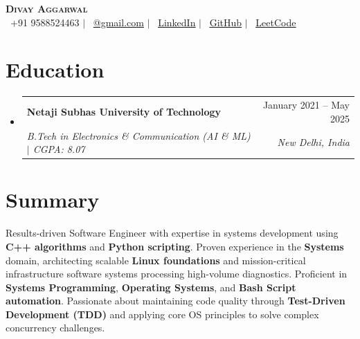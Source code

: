 \documentclass[letterpaper, 10pt]{article}
\makeatletter
\newcommand{\resumeSubheading}[4]{
  \vspace{-2pt}\item
    \begin{tabular*}{0.97\textwidth}[t]{l@{\extracolsep{\fill}}r}
      \textbf{#1} & #2 \\
      \textit{\small#3} & \textit{\small #4} \\
    \end{tabular*}\vspace{-5pt}
}
\newcommand{\resumeSubHeadingListStart}{\begin{itemize}[leftmargin=0.05in, label={}]}
\newcommand{\resumeSubHeadingListEnd}{\end{itemize}}
\makeatother
\begin{document}
\begin{center}
    \textbf{\Huge \scshape Divay Aggarwal} \\ \vspace{5pt}
    \small
    \faPhone\ +91 9588524463 \quad $|$ \quad
    \faEnvelope\ \href{mailto:divay958@gmail.com}{@gmail.com} \quad $|$ \quad
    \faLinkedin\ \href{https://www.linkedin.com/in/divay060203/}{\underline{LinkedIn}} \quad $|$ \quad
    \faGithub\ \href{https://github.com/Ddotdeveloper}{\underline{GitHub}} \quad $|$ \quad
    \faCode\ \href{https://leetcode.com/divay_garg/}{\underline{LeetCode}}
\end{center}

\section{Education}
  \resumeSubHeadingListStart
    \resumeSubheading
      {Netaji Subhas University of Technology}{January 2021 -- May 2025}
      {B.Tech in Electronics \& Communication (AI \& ML) $|$ CGPA: 8.07}{New Delhi, India}
  \resumeSubHeadingListEnd

\section{Summary}
\small{
Results-driven Software Engineer with expertise in systems development using \textbf{C++ algorithms} and \textbf{Python scripting}. Proven experience in the \textbf{Systems} domain, architecting scalable \textbf{Linux foundations} and mission-critical infrastructure software systems processing high-volume diagnostics. Proficient in \textbf{Systems Programming}, \textbf{Operating Systems}, and \textbf{Bash Script automation}. Passionate about maintaining code quality through \textbf{Test-Driven Development (TDD)} and applying core OS principles to solve complex concurrency challenges.
}

\end{document}

